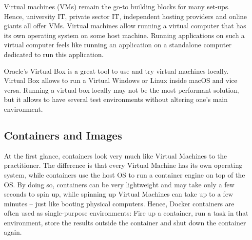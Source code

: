 \documentclass[
  12pt,
  letterpaper,
]{krantz}
\begin{document}
Virtual machines (VMs) remain the go-to building blocks for many
set-ups. Hence, university IT, private sector IT, independent hosting
providers and online giants all offer VMs. Virtual machines allow
running a virtual computer that has its own operating system on some
host machine. Running applications on such a virtual computer feels like
running an application on a standalone computer dedicated to run this
application.

\begin{tcolorbox}[enhanced jigsaw, colback=white, leftrule=.75mm, breakable, colframe=quarto-callout-note-color-frame, bottomrule=.15mm, arc=.35mm, opacityback=0, rightrule=.15mm, toprule=.15mm, left=2mm]
\begin{minipage}[t]{5.5mm}
\textcolor{quarto-callout-note-color}{\faInfo}
\end{minipage}%
\begin{minipage}[t]{\textwidth - 5.5mm}

Oracle's Virtual Box is a great tool to use and try virtual machines
locally. Virtual Box allows to run a Virtual Windows or Linux inside
macOS and vice versa. Running a virtual box locally may not be the most
performant solution, but it allows to have several test environments
without altering one's main environment.

\end{minipage}%
\end{tcolorbox}

\hypertarget{containers-and-images}{%
\subsection{Containers and Images}\label{containers-and-images}}

At the first glance, containers look very much like
Virtual Machines to the practitioner. The
difference is that every Virtual Machine has its own operating system,
while containers use the host OS to run a container engine on top of the
OS. By doing so, containers can be very lightweight and may take only a
few seconds to spin up, while spinning up Virtual Machines can take up
to a few minutes -- just like booting physical computers. Hence,
Docker containers are often used as single-purpose
environments: Fire up a container, run a task in that environment, store
the results outside the container and shut down the
container again.
\end{document}
